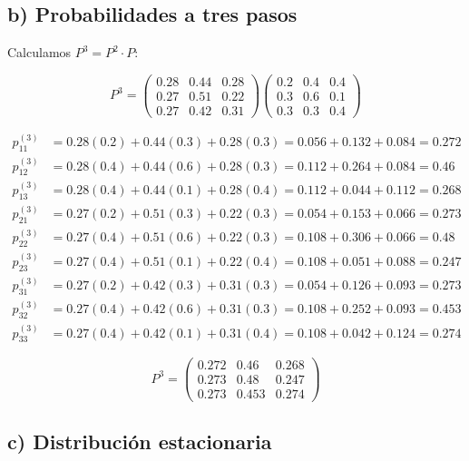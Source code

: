 \documentclass{article}
\begin{document}
\subsection*{b) Probabilidades a tres pasos}

Calculamos \(P^3 = P^2 \cdot P\):

\[
P^3 = \begin{pmatrix} 
0.28 & 0.44 & 0.28 \\ 
0.27 & 0.51 & 0.22 \\ 
0.27 & 0.42 & 0.31 
\end{pmatrix}
\begin{pmatrix} 
0.2 & 0.4 & 0.4 \\ 
0.3 & 0.6 & 0.1 \\ 
0.3 & 0.3 & 0.4 
\end{pmatrix}
\]

\[
\begin{aligned}
p_{11}^{(3)} &= 0.28(0.2) + 0.44(0.3) + 0.28(0.3) = 0.056 + 0.132 + 0.084 = 0.272 \\
p_{12}^{(3)} &= 0.28(0.4) + 0.44(0.6) + 0.28(0.3) = 0.112 + 0.264 + 0.084 = 0.46 \\
p_{13}^{(3)} &= 0.28(0.4) + 0.44(0.1) + 0.28(0.4) = 0.112 + 0.044 + 0.112 = 0.268 \\
p_{21}^{(3)} &= 0.27(0.2) + 0.51(0.3) + 0.22(0.3) = 0.054 + 0.153 + 0.066 = 0.273 \\
p_{22}^{(3)} &= 0.27(0.4) + 0.51(0.6) + 0.22(0.3) = 0.108 + 0.306 + 0.066 = 0.48 \\
p_{23}^{(3)} &= 0.27(0.4) + 0.51(0.1) + 0.22(0.4) = 0.108 + 0.051 + 0.088 = 0.247 \\
p_{31}^{(3)} &= 0.27(0.2) + 0.42(0.3) + 0.31(0.3) = 0.054 + 0.126 + 0.093 = 0.273 \\
p_{32}^{(3)} &= 0.27(0.4) + 0.42(0.6) + 0.31(0.3) = 0.108 + 0.252 + 0.093 = 0.453 \\
p_{33}^{(3)} &= 0.27(0.4) + 0.42(0.1) + 0.31(0.4) = 0.108 + 0.042 + 0.124 = 0.274
\end{aligned}
\]

\[
P^3 = \begin{pmatrix} 
0.272 & 0.46 & 0.268 \\ 
0.273 & 0.48 & 0.247 \\ 
0.273 & 0.453 & 0.274 
\end{pmatrix}
\]

\subsection*{c) Distribución estacionaria}
\end{document}

